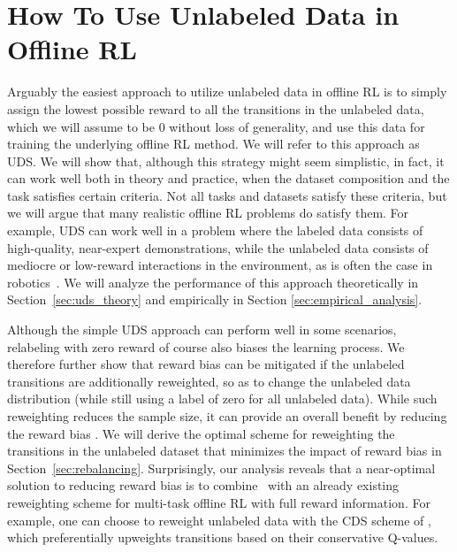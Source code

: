 \section{How To Use Unlabeled Data in Offline RL}
\vspace{-0.1cm}
\label{sec:method}
Arguably the easiest approach to utilize unlabeled data in offline RL is to simply assign the lowest possible reward to all the transitions in the unlabeled data, which we will assume to be $0$ without loss of generality, and use this data for training the underlying offline RL method. We will refer to this approach as UDS. We will show that, although this strategy might seem simplistic, in fact, it can work well both in theory and practice, when the dataset composition and the task satisfies certain criteria. Not all tasks and datasets satisfy these criteria, but we will argue that many realistic offline RL problems do satisfy them. For example, UDS can work well in a problem where the labeled data consists of high-quality, near-expert demonstrations, while the unlabeled data consists of mediocre or low-reward interactions in the environment, as is often the case in robotics~\citep{xie2019improvisation}. 
We will analyze the performance of this approach theoretically in Section~\ref{sec:uds_theory} and empirically in Section \ref{sec:empirical_analysis}.

Although the simple UDS approach can perform well in some scenarios, relabeling with zero reward of course also biases the learning process. We therefore further show that reward bias can be mitigated if the unlabeled transitions are additionally reweighted, so as to change the unlabeled data distribution (while still using a label of zero for all unlabeled data). While such reweighting reduces the sample size, it can provide an overall benefit by reducing the reward bias . We will derive the optimal scheme for reweighting the transitions in the unlabeled dataset that minimizes the impact of reward bias in Section~\ref{sec:rebalancing}. Surprisingly, our analysis reveals that a near-optimal solution to reducing reward bias is to combine \uds\ with an already existing reweighting scheme for multi-task offline RL with full reward information. For example, one can choose to reweight unlabeled data with the  {CDS} scheme of \citet{yu2021conservative}, which preferentially upweights transitions based on their conservative Q-values.

\vspace{-0.1cm}
